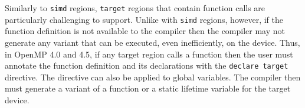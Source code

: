 Similarly to \texttt{simd} regions, \texttt{target} regions that contain 
function calls are particularly challenging to support.  Unlike with 
\texttt{simd} regions, however, if the function definition is not 
available to the compiler then the compiler may not generate any variant
that can be executed, even inefficiently, on the device. Thus, in OpenMP 4.0
and 4.5, if any target region calls a function then the user must annotate  
the function definition and its declarations with the \texttt{declare target} 
directive. The directive can also be applied to global variables. The compiler
then must generate a variant of a function or a static lifetime variable for 
the target device. 



